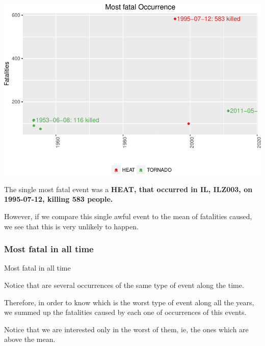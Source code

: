 \documentclass[]{article}
\begin{document}
\includegraphics{readme_files/figure-latex/fatal-plot-single-1.pdf}

The single most fatal event was a \textbf{HEAT, that occurred in IL,
ILZ003, on 1995-07-12, killing 583 people.}

However, if we compare this single awful event to the mean of fatalities
caused, we see that this is very unlikely to happen.

\subsubsection{Most fatal in all time}\label{most-fatal-in-all-time}

Most fatal in all time

Notice that are several occurrences of the same type of event along the
time.

Therefore, in order to know which is the worst type of event along all
the years, we summed up the fatalities caused by each one of occurrences
of this events.

Notice that we are interested only in the worst of them, ie, the ones
which are above the mean.
\end{document}
